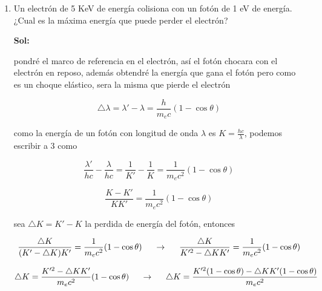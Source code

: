 \documentclass[12pt,a4paper]{article}
\begin{document}
\begin{enumerate}
    
    
    
    
    \item Un electrón de 5 KeV de energía colisiona con un fotón de 1 eV de energía. ¿Cual es la máxima energía que puede perder el electrón?
    
    \textbf{Sol:}
    
    pondré el marco de referencia en el electrón, así el fotón chocara con el electrón en reposo, además obtendré la energía que gana el fotón pero como es un choque elástico, sera la misma que pierde el electrón
    
    \begin{equation}
        \triangle \lambda = \lambda' - \lambda = \frac{h}{m_e c} (1- \cos{\theta})
    \end{equation}
    
    como la energía de un fotón con longitud de onda $\lambda$ es $K = \frac{hc}{\lambda}$, podemos escribir a 3 como
    
    \begin{equation*}
        \frac{\lambda'}{hc} - \frac{\lambda}{hc} =\frac{1}{K'}- \frac{1}{K}= \frac{1}{m_e c^2} (1 - \cos{\theta})
    \end{equation*}
    
    \begin{equation*}
        \frac{K-K'}{KK'} = \frac{1}{m_e c^2} (1 - \cos{\theta})
    \end{equation*}
    
    sea $\triangle K = K'-K$ la perdida de energía del fotón, entonces
    
    \begin{equation*}
        \frac{\triangle K}{(K'- \triangle K) K'} = \frac{1}{m_e c^2} (1 - \cos{\theta}) \hspace{0.5cm} \rightarrow \hspace{0.5cm}\frac{\triangle K}{K'^2- \triangle K K'} = \frac{1}{m_e c^2} (1 - \cos{\theta})
    \end{equation*}
    
    \begin{equation*}
        \triangle K = \frac{K'^2- \triangle K K'}{m_e c^2} (1 - \cos{\theta}) \hspace{0.5cm} \rightarrow \hspace{0.5cm} \triangle K = \frac{K'^2(1 - \cos{\theta})- \triangle K K'(1 - \cos{\theta})}{m_e c^2} 
    \end{equation*}
    

\end{enumerate}
\end{document}
